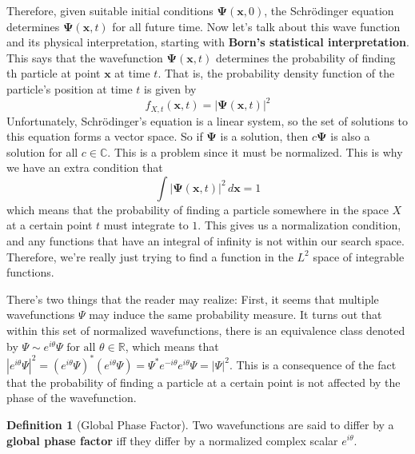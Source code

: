 \documentclass{article}
\theoremstyle{definition}
\newtheorem{definition}{Definition}[section]
\begin{document}
    Therefore, given suitable initial conditions $\boldsymbol{\Psi}(\mathbf{x}, 0)$, the Schr\"odinger equation determines $\boldsymbol{\Psi}(\mathbf{x}, t)$ for all future time. Now let's talk about this wave function and its physical interpretation, starting with \textbf{Born's statistical interpretation}. This says that the wavefunction $\boldsymbol{\Psi}(\mathbf{x}, t)$ determines the probability of finding th particle at point $\mathbf{x}$ at time $t$. That is, the probability density function of the particle's position at time $t$ is given by 
    \begin{equation} 
      f_{X, t} (\mathbf{x}, t) = |\boldsymbol{\Psi}(\mathbf{x}, t)|^2
    \end{equation}
    Unfortunately, Schr\"odinger's equation is a linear system, so the set of solutions to this equation forms a vector space. So if $\boldsymbol{\Psi}$ is a solution, then $c \boldsymbol{\Psi}$ is also a solution for all $c \in \mathbb{C}$. This is a problem since it must be normalized. This is why we have an extra condition that 
    \begin{equation} 
    \int |\boldsymbol{\Psi}(\mathbf{x}, t)|^2 \,d \mathbf{x} = 1
    \end{equation}
    which means that the probability of finding a particle somewhere in the space $X$ at a certain point $t$ must integrate to $1$. This gives us a normalization condition, and any functions that have an integral of infinity is not within our search space. Therefore, we're really just trying to find a function in the $L^2$ space of integrable functions. 

    There's two things that the reader may realize: First, it seems that multiple wavefunctions $\Psi$ may induce the same probability measure. It turns out that within this set of normalized wavefunctions, there is an equivalence class denoted by $\Psi \sim e^{i \theta} \Psi \text{ for all } \theta \in \mathbb{R}$, which means that $|e^{i \theta} \Psi|^2 = (e^{i \theta} \Psi)^\ast (e^{i \theta} \Psi) = \Psi^\ast e^{-i \theta} e^{i \theta} \Psi = |\Psi|^2$. This is a consequence of the fact that the probability of finding a particle at a certain point is not affected by the phase of the wavefunction.

    \begin{definition}[Global Phase Factor]
      Two wavefunctions are said to differ by a \textbf{global phase factor} iff they differ by a normalized complex scalar $e^{i \theta}$.  
    \end{definition}
\end{document}
